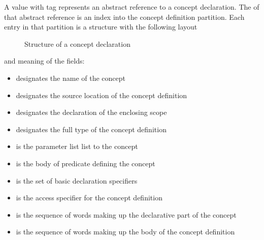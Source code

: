 A  value with tag  represents an abstract reference
to a concept declaration.  The  of that abstract reference is an index into the concept
definition partition.  Each entry in that partition is a structure with the following layout
%
\begin{figure}[H]
	\centering
	\caption{Structure of a concept declaration}
	\label{fig:ifc-concept-decl-structure}
\end{figure}
%
and meaning of the fields:
\begin{itemize}
	\item {} designates the name of the concept
	\item {} designates the source location of the concept definition
	\item {} designates the declaration of the enclosing scope
	\item {} designates the full type of the concept definition
	\item {} is the parameter list list to the concept
	\item {} is the body of predicate defining the concept
	\item {} is the set of basic declaration specifiers
	\item {} is the access specifier for the concept definition
	\item {} is the sequence of words making up the declarative part of the concept
	\item {} is the sequence of words making up the body of the concept definition
\end{itemize}

